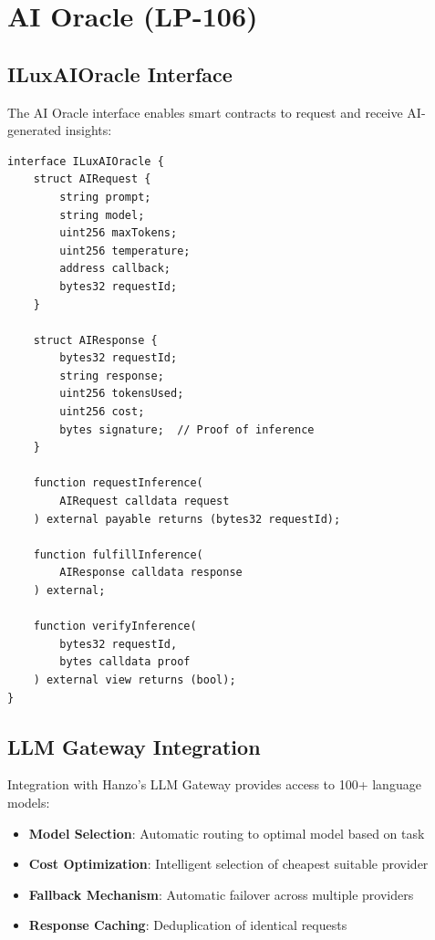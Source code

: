 \section{AI Oracle (LP-106)}


\subsection{ILuxAIOracle Interface}

The AI Oracle interface enables smart contracts to request and receive AI-generated insights:

\begin{lstlisting}[caption={AI Oracle Smart Contract Interface}]
interface ILuxAIOracle {
    struct AIRequest {
        string prompt;
        string model;
        uint256 maxTokens;
        uint256 temperature;
        address callback;
        bytes32 requestId;
    }

    struct AIResponse {
        bytes32 requestId;
        string response;
        uint256 tokensUsed;
        uint256 cost;
        bytes signature;  // Proof of inference
    }

    function requestInference(
        AIRequest calldata request
    ) external payable returns (bytes32 requestId);

    function fulfillInference(
        AIResponse calldata response
    ) external;

    function verifyInference(
        bytes32 requestId,
        bytes calldata proof
    ) external view returns (bool);
}
\end{lstlisting}

\subsection{LLM Gateway Integration}

Integration with Hanzo's LLM Gateway provides access to 100+ language models:

\begin{itemize}
    \item \textbf{Model Selection}: Automatic routing to optimal model based on task
    \item \textbf{Cost Optimization}: Intelligent selection of cheapest suitable provider
    \item \textbf{Fallback Mechanism}: Automatic failover across multiple providers
    \item \textbf{Response Caching}: Deduplication of identical requests
\end{itemize}

